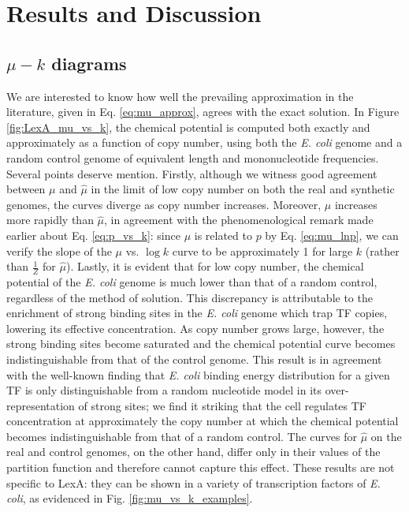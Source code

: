 \documentclass{article}
\begin{document}
\section{Results and Discussion}
\subsection{$\mu-k$ diagrams}
We are interested to know how well the prevailing approximation in the
literature, given in Eq. \ref{eq:mu_approx}, agrees with the exact
solution.  In Figure \ref{fig:LexA_mu_vs_k}, the chemical potential is
computed both exactly and approximately as a function of copy number,
using both the \textit{E. coli} genome and a random control genome of
equivalent length and mononucleotide frequencies.  Several points
deserve mention.  Firstly, although we witness good agreement between
$\mu$ and $\hat\mu$ in the limit of low copy number on both the real
and synthetic genomes, the curves diverge as copy number increases.
Moreover, $\mu$ increases more rapidly than $\hat\mu$, in agreement
with the phenomenological remark made earlier about
Eq. \ref{eq:p_vs_k}: since $\mu$ is related to $p$ by Eq.
\ref{eq:mu_lnp}, we can verify the slope of the $\mu$ vs. $\log k$
curve to be approximately 1 for large $k$ (rather than $\frac{1}{Z}$
for $\hat\mu$).  Lastly, it is evident that for low copy number, the
chemical potential of the \textit{E. coli} genome is much lower than
that of a random control, regardless of the method of solution.  This
discrepancy is attributable to the enrichment of strong binding sites
in the \textit{E. coli} genome which trap TF copies, lowering its
effective concentration.  As copy number grows large, however, the
strong binding sites become saturated and the chemical potential curve
becomes indistinguishable from that of the control genome.  This
result is in agreement with the well-known finding that
\textit{E. coli} binding energy distribution for a given TF is only
distinguishable from a random nucleotide model in its
over-representation of strong sites\cite{gerland02}\cite{lassig07}; we
find it striking that the cell regulates TF concentration at
approximately the copy number at which the chemical potential becomes
indistinguishable from that of a random control.  The curves for
$\hat\mu$ on the real and control genomes, on the other hand, differ
only in their values of the partition function and therefore cannot
capture this effect.  These results are not specific to LexA: they can
be shown in a variety of transcription factors of \textit{E. coli}, as
evidenced in Fig. \ref{fig:mu_vs_k_examples}.
\end{document}
